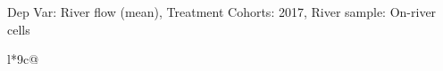\begin{table}[H]
\captionlistentry[table]{}
\label{table:beaver_hydrometry_DVflow_mean_SCg2}
\tiny %
Dep Var: River flow (mean), Treatment Cohorts: 2017, River sample: On-river cells \\
\begin{threeparttable}
\begin{tabulary}{\textwidth}{l*{9}{c}@{}}
\toprule \toprule
\noalign{\smallskip}
\noalign{\smallskip}
\midrule \bottomrule
\end{tabulary}
\medskip
\end{threeparttable}
\end{table}

